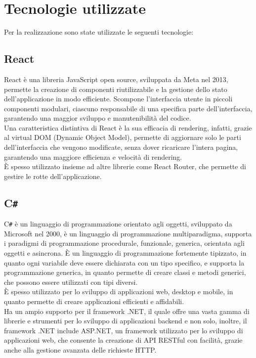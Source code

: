 \section{Tecnologie utilizzate}
Per la realizzazione sono state utilizzate le seguenti tecnologie:
\subsection{React}
React è una libreria JavaScript open source, sviluppata da Meta nel 2013, permette la creazione di componenti riutilizzabile e la gestione dello stato dell'applicazione in modo efficiente.
Scompone l'interfaccia utente in piccoli componenti modulari, ciascuno responsabile di una specifica parte dell'interfaccia, garantendo una maggior sviluppo e manutenibilità del codice.\\
Una caratteristica distintiva di React è la sua efficacia di rendering, infatti, grazie al virtual DOM (Dynamic Object Model), permette di aggiornare solo le parti dell'interfaccia che vengono modificate,
senza dover ricaricare l'intera pagina, garantendo una maggiore efficienza e velocità di rendering.\\
È spesso utilizzato insieme ad altre librerie come React Router, che permette di gestire le rotte dell'applicazione.\\

\subsection{C\texttt{\#}}
C\texttt{\#} è un linguaggio di programmazione orientato agli oggetti, sviluppato da Microsoft nel 2000, è un linguaggio di programmazione multiparadigma, supporta i paradigmi di programmazione procedurale, funzionale, generica, orientata agli oggetti e asincrona.
È un linguaggio di programmazione fortemente tipizzato, in quanto ogni variabile deve essere dichiarata con un tipo specifico, e supporta la programmazione generica, in quanto permette di creare classi e metodi generici, che possono essere utilizzati con tipi diversi.\\
È spesso utilizzato per lo sviluppo di applicazioni web, desktop e mobile, in quanto permette di creare applicazioni efficienti e affidabili.\\
Ha un ampio supporto per il framework .NET, il quale offre una vasta gamma di librerie e strumenti per lo sviluppo di applicazioni backend e non solo, inoltre, il framework .NET include
ASP.NET, un framework utilizzato per lo sviluppo di applicazioni web, che consente la creazione di API RESTful con facilità, grazie anche alla gestione avanzata delle richieste HTTP.\\

